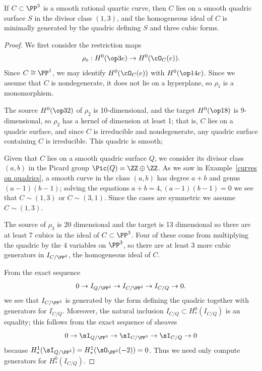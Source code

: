 \begin{proposition}\label{ideal of rational quartic}
If $C\subset \PP^3$ is a smooth rational quartic curve, then $C$ lies on a smooth quadric
surface $S$ in the divisor class $(1,3)$, and the homogeneous ideal of $C$ is minimally
generated by the quadric defining $S$ and three cubic forms.
\end{proposition}

\begin{proof}
We first consider the restriction maps
$$
\rho_e: H^0(\op3e)\to H^0(\cO_C(e)).
$$
Since $C\cong \PP^1$,
we may identify $H^0(\cO_C(e))$ with $H^0(\op1{4e})$.
 Since we assume that $C$ is nondegenerate, it does not lie on a hyperplane,
 so  $\rho_1$ is a monomorphism. 
 
The source $H^0(\op32)$ of $\rho_2$ is 10-dimensional, and the target $H^0(\op18)$ is
9-dimensional, so $\rho_2$ has a kernel of dimension at least 1; that is, $C$ lies on
a quadric surface, and since $C$ is irreducible and nondegenerate, any quadric surface containing
$C$ is irreducible. This quadric is smooth; 


Given that $C$ lies on a smooth quadric surface $Q$, we consider its divisor class $(a,b)$ in the 
Picard group $\Pic(Q) = \ZZ\oplus \ZZ$. As we saw in Example~\ref{curves on quadrics}, a smooth curve
in the class $(a,b)$ has degree $a+b$ and genus $(a-1)(b-1)$; solving the equations $a+b=4, (a-1)(b-1)=0$ we see that $C\sim (1,3)$ or $C\sim (3,1)$. Since the cases
are symmetric we assume $C\sim(1,3)$. 

The source of $\rho_3$ is 20 dimensional and the target is 13 dimensional so there are at least 7
cubics in the ideal of $C\subset \PP^3$. Four of these come from multiplying the quadric
by the 4 variables on $\PP^3$, so there are at least 3 more cubic generators in $I_{C/\PP^3}$,
 the homogeneous ideal of $C$. 

From the exact sequence 
$$
0\to I_{Q/\PP^3} \to I_{C/\PP^3} \to I_{C/Q} \to 0.
$$
we see that $I_{C/\PP^3}$ is generated by the form defining the quadric 
together with generators for $I_{C/Q}$. Moreover, 
the natural inclusion $I_{C/Q}\subset H^{0}_{*}(I_{C/Q})$ is an equality; this follows from the exact sequence of sheaves
$$
0\to \sI_{Q/\PP^3} \to \sI_{C/\PP^3} \to \sI_{C/Q} \to 0
$$
because $H^{1}_{*}(\sI_{Q/\PP^3}) = H^{1}_{*}(\sO_{\PP^3}(-2)) = 0$.
Thus we need only compute generators for $H^{0}_{*}(I_{C/Q})$.


\end{proof}
